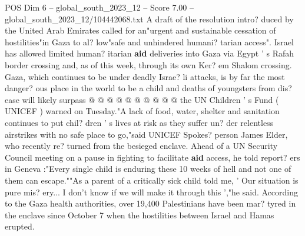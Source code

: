 \begin{textsample}{POS Dim 6 – global\_south\_2023\_12 – Score 7.00 – global\_south\_2023\_12/104442068.txt}
A draft of the resolution intro? duced by the United Arab Emirates called for an"urgent and sustainable cessation of hostilities"in Gaza to al? low"safe and unhindered humani? tarian access".
Israel has allowed limited human? itarian \textbf{aid} deliveries into Gaza via Egypt ' s Rafah border crossing and, as of this week, through its own Ker? em Shalom crossing.
Gaza, which continues to be under deadly Israe? li attacks, is by far the most danger? ous place in the world to be a child and deaths of youngsters from dis? ease will likely surpass @ @ @ @ @ @ @ @ @ @ the UN Children ' s Fund ( UNICEF ) warned on Tuesday."A lack of food, water, shelter and sanitation continues to put chil? dren ' s lives at risk as they suffer un? der relentless airstrikes with no safe place to go,"said UNICEF Spokes? person James Elder, who recently re? turned from the besieged enclave.
Ahead of a UN Security Council meeting on a pause in fighting to facilitate \textbf{aid} access, he told report? ers in Geneva :"Every single child is enduring these 10 weeks of hell and not one of them can escape.""As a parent of a critically sick child told me, ' Our situation is pure mis? ery...
I don't know if we will make it through this ',"he said.
According to the Gaza health authorities, over 19,400 Palestinians have been mar? tyred in the enclave since October 7 when the hostilities between Israel and Hamas erupted.

\end{textsample}
